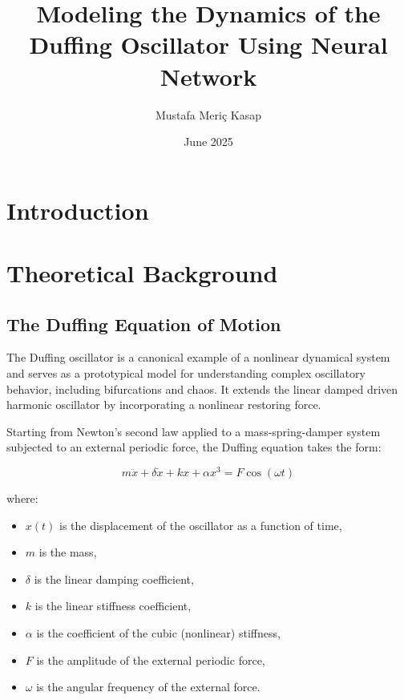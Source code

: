 \documentclass{article}
\title{Modeling the Dynamics of the Duffing Oscillator Using Neural Network}
\author{Mustafa Meriç Kasap}
\date{June 2025}
\begin{document}
\maketitle

\section{Introduction}












\section{Theoretical Background}

\subsection{The Duffing Equation of Motion}

The Duffing oscillator is a canonical example of a nonlinear dynamical system and serves as a prototypical model for understanding complex oscillatory behavior, including bifurcations and chaos. It extends the linear damped driven harmonic oscillator by incorporating a nonlinear restoring force.

Starting from Newton’s second law applied to a mass-spring-damper system subjected to an external periodic force, the Duffing equation takes the form:

\begin{equation}
    m\ddot{x} + \delta \dot{x} + kx + \alpha x^3 = F \cos(\omega t)
\end{equation}

where:
\begin{itemize}
    \item $x(t)$ is the displacement of the oscillator as a function of time,
    \item $m$ is the mass,
    \item $\delta$ is the linear damping coefficient,
    \item $k$ is the linear stiffness coefficient,
    \item $\alpha$ is the coefficient of the cubic (nonlinear) stiffness,
    \item $F$ is the amplitude of the external periodic force,
    \item $\omega$ is the angular frequency of the external force.
\end{itemize}
\end{document}
